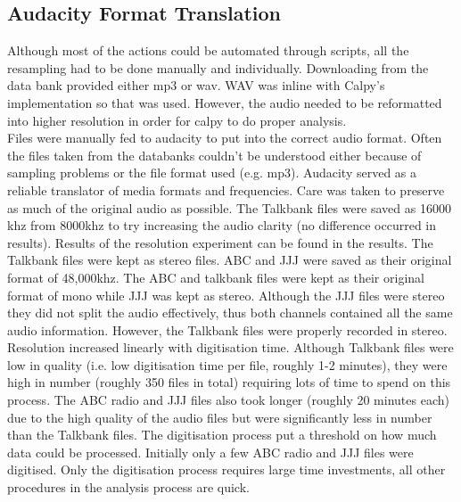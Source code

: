 \subsection{Audacity Format Translation} Although most of the actions could be automated through scripts, all the resampling had to be done manually and individually. Downloading from the data bank provided either mp3 or wav. WAV was inline with Calpy's implementation so that was used. However, the audio needed to be reformatted into higher resolution in order for calpy to do proper analysis. \\

Files were manually fed to audacity to put into the correct audio format. Often the files taken from the databanks couldn't be understood either because of sampling problems or the file format used (e.g. mp3). Audacity served as a reliable translator of media formats and frequencies. Care was taken to preserve as much of the original audio as possible. The Talkbank files were saved as 16000 khz from 8000khz to try increasing the audio clarity (no difference occurred in results). Results of the resolution experiment can be found in the results. The Talkbank files were kept as stereo files. ABC and JJJ were saved as their original format of 48,000khz. The ABC and talkbank files were kept as their original format of mono while JJJ was kept as stereo. Although the JJJ files were stereo they did not split the audio effectively, thus both channels contained all the same audio information. However, the Talkbank files were properly recorded in stereo. \\

Resolution increased linearly with digitisation time. Although Talkbank files were low in quality (i.e. low digitisation time per file, roughly 1-2 minutes), they were high in number (roughly 350 files in total) requiring lots of time to spend on this process. The ABC radio and JJJ files also took longer (roughly 20 minutes each) due to the high quality of the audio files but were significantly less in number than the Talkbank files. The digitisation process put a threshold on how much data could be processed. Initially only a few ABC radio and JJJ files were digitised. Only the digitisation process requires large time investments, all other procedures in the analysis process are quick. \\




